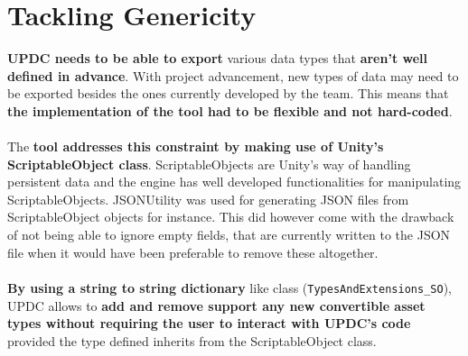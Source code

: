 \documentclass[12pt,a4paper]{article}
\begin{document}
\section{Tackling Genericity}
\textbf{UPDC needs to be able to export} various data types that \textbf{aren't well defined in advance}. With project advancement, new types of data may need to be exported besides the ones currently developed by the team. This means that \textbf{the implementation of the tool had to be flexible and not hard-coded}.\\\\
The \textbf{tool addresses this constraint by making use of Unity's ScriptableObject class}. ScriptableObjects are Unity's way of handling persistent data and the engine has well developed functionalities for manipulating ScriptableObjects. JSONUtility was used for generating JSON files from ScriptableObject objects for instance. This did however come with the drawback of not being able to ignore empty fields, that are currently written to the JSON file when it would have been preferable to remove these altogether.\\\\
\textbf{By using a string to string dictionary} like class (\texttt{TypesAndExtensions\_SO}), UPDC allows to \textbf{add and remove support any new convertible asset types without requiring the user to interact with UPDC's code} provided the type defined inherits from the ScriptableObject class.
\end{document}
